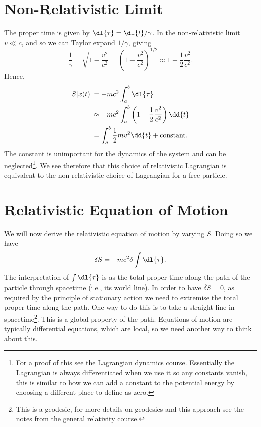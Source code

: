 \documentclass[fleqn]{NotesClass}
\begin{document}
    \section{Non-Relativistic Limit}
    The proper time is given by \(\dl{\tau} = \dl{t}/\gamma\).
    In the non-relativistic limit \(v \ll c\), and so we can Taylor expand \(1/\gamma\), giving
    \begin{equation}
        \frac{1}{\gamma} = \sqrt{1 - \frac{v^2}{c^2}} = \left( 1 - \frac{v^2}{c^2} \right)^{1/2} \approx 1 - \frac{1}{2}\frac{v^2}{c^2}.
    \end{equation}
    Hence,
    \begin{align}
        S[x(t)] &= -mc^2\int_a^b \dl{\tau}\\
        &\approx -mc^2 \int_a^b \left( 1 - \frac{1}{2}\frac{v^2}{c^2} \right) \dd{t}\\
        &=\int_a^b \frac{1}{2}mv^2 \dd{t} + \text{constant}.
    \end{align}
    The constant is unimportant for the dynamics of the system and can be neglected\footnote{For a proof of this see the Lagrangian dynamics course. Essentially the Lagrangian is always differentiated when we use it so any constants vanish, this is similar to how we can add a constant to the potential energy by choosing a different place to define as zero.}.
    We see therefore that this choice of relativistic Lagrangian is equivalent to the non-relativistic choice of Lagrangian for a free particle.
    
    \section{Relativistic Equation of Motion}
    We will now derive the relativistic equation of motion by varying \(S\).
    Doing so we have
    \begin{equation}
        \delta S = -mc^2 \delta\int \dl{\tau}.
    \end{equation}
    The interpretation of \(\int \dl{\tau}\) is as the total proper time along the path of the particle through spacetime (i.e., its world line).
    In order to have \(\delta S = 0\), as required by the principle of stationary action we need to extremise the total proper time along the path.
    One way to do this is to take a straight line in spacetime\footnote{This is a geodesic, for more details on geodesics and this approach see the notes from the general relativity course.}.
    This is a global property of the path.
    Equations of motion are typically differential equations, which are local, so we need another way to think about this.
    
\end{document}
